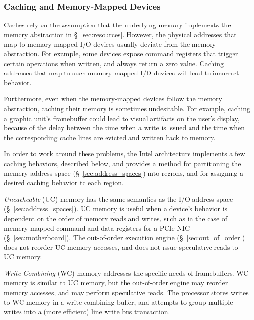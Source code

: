 \subsubsection{Caching and Memory-Mapped Devices}
\label{sec:memory_io}
\label{sec:cacheability_config}

Caches rely on the assumption that the underlying memory implements the memory
abstraction in \S~\ref{sec:resources}. However, the physical addresses that map
to memory-mapped I/O devices usually deviate from the memory abstraction. For
example, some devices expose command registers that trigger certain operations
when written, and always return a zero value. Caching addresses that map to
such memory-mapped I/O devices will lead to incorrect behavior.

Furthermore, even when the memory-mapped devices follow the memory abstraction,
caching their memory is sometimes undesirable. For example, caching a graphic
unit's framebuffer could lead to visual artifacts on the user's display,
because of the delay between the time when a write is issued and the time when
the corresponding cache lines are evicted and written back to memory.

In order to work around these problems, the Intel architecture implements a few
caching behaviors, described below, and provides a method for partitioning the
memory address space (\S~\ref{sec:address_spaces}) into regions, and for
assigning a desired caching behavior to each region.


\textit{Uncacheable} (UC) memory has the same semantics as the I/O address
space (\S~\ref{sec:address_spaces}). UC memory is useful when a device's
behavior is dependent on the order of memory reads and writes, such as in the
case of memory-mapped command and data registers for a PCIe NIC
(\S~\ref{sec:motherboard}). The out-of-order execution engine
(\S~\ref{sec:out_of_order}) does not reorder UC memory accesses, and does not
issue speculative reads to UC memory.

\textit{Write Combining} (WC) memory addresses the specific needs of
framebuffers. WC memory is similar to UC memory, but the out-of-order engine
may reorder memory accesses, and may perform speculative reads. The processor
stores writes to WC memory in a write combining buffer, and attempts to group
multiple writes into a (more efficient) line write bus transaction.

